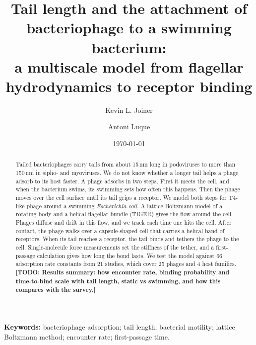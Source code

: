 \documentclass[12pt]{article}
\newcommand{\todo}[1]{{\color{blue}\textbf{[TODO: #1]}}}
\begin{document}
\title{Tail length and the attachment of bacteriophage to a swimming bacterium:\\ a multiscale model from flagellar hydrodynamics to receptor binding}
\date{\today}
\author[1,2,*]{Kevin L. Joiner}
\author[3,4]{Antoni Luque}
\setcounter{Maxaffil}{0}
\renewcommand\Affilfont{\itshape\small}

\maketitle
\clearpage

\begin{abstract}
Tailed bacteriophages carry tails from about 15\,nm long in podoviruses to more than 150\,nm in sipho- and myoviruses. We do not know whether a longer tail helps a phage adsorb to its host faster. A phage adsorbs in two steps. First it meets the cell, and when the bacterium swims, its swimming sets how often this happens. Then the phage moves over the cell surface until its tail grips a receptor. We model both steps for T4-like phage around a swimming \textit{Escherichia coli}. A lattice Boltzmann model of a rotating body and a helical flagellar bundle (TIGER) gives the flow around the cell. Phages diffuse and drift in this flow, and we track each time one hits the cell. After contact, the phage walks over a capsule-shaped cell that carries a helical band of receptors. When its tail reaches a receptor, the tail binds and tethers the phage to the cell. Single-molecule force measurements set the stiffness of the tether, and a first-passage calculation gives how long the bond lasts. We test the model against 66 adsorption rate constants from 21 studies, which cover 25 phages and 4 host families. \todo{Results summary: how encounter rate, binding probability and time-to-bind scale with tail length, static vs swimming, and how this compares with the survey.}
\end{abstract}

\noindent\textbf{Keywords:} bacteriophage adsorption; tail length; bacterial motility; lattice Boltzmann method; encounter rate; first-passage time.
%
\end{document}
